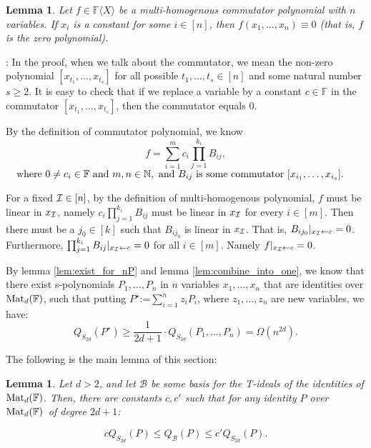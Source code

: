 \documentclass[12pt,reqno]{article}
\newtheorem{lemma}[theorem]{Lemma}
\renewcommand{\dot}[1]{{#1}^\star}
\newcommand\F{\ensuremath{\mathbb F}}
\newcommand\N{\ensuremath{\mathbb N}}
\newcommand{\cd}{\cdot}
\newcommand{\matd}{{\ensuremath{{\rm Mat}_d(\F)}}}
\newcommand{\freea}{\ensuremath{\F\langle X\rangle}}
\newenvironment{proof}{\QuadSpace\par\noindent{\bf Proof}:}{\EndProof\HalfSpace}
\newcommand{\QuadSpace}{\vspace{0.25\baselineskip}}
\newcommand{\HalfSpace}{\vspace{0.5\baselineskip}}
\newcommand{\EndProof}{ \hfill \vrule width 1ex height 1ex depth 0pt }
\newcommand{\nx}[1]{#1_1,\ldots,#1_{n}}
\newcommand\ii{{\cal I}}
\begin{document}
\begin{lemma}\label{lem:collapse}
  Let  $f\in \freea$ be a  multi-homogenous  commutator polynomial with $n$ variables.
 If $x_i$ is a constant for some  $i\in[n]$,  then $f(\nx{x})\equiv 0$ (that is, $f$ is the zero polynomial).
\end{lemma}
\begin{proof} In the proof, when we talk about the commutator, we mean the non-zero polynomial $[x_{t_1},\ldots,x_{t_s}]$ for all possible $t_1,\ldots, t_s\in[n]$ and some natural number $s\geq 2$. It is easy to check that if we replace a variable by  a constant $c\in \F$ in the commutator $[x_{t_1},\ldots,x_{t_s}]$, then the commutator equals $0$.

By the definition of commutator polynomial, we know
$$f=\sum_{i=1}^m c_i\prod_{j=1}^{k_i} B_{ij},$$
$~~~\text{where }0\neq c_i\in \F\hbox{ and }m,n\in \N,\text{ and  $B_{ij}$ is some  commutator $[x_{i_1},\ldots,x_{i_s}]$}. $
\smallskip


For a fixed $\ii\in[n]$, by the  definition of multi-homogenous polynomial, $f$ must be linear in  $x_\ii$, namely $c_i\prod_{j=1}^{k_i}B_{ij}$ must be linear in  $x_\ii$ for every $i\in[m]$. Then there must be a $j_0\in[k]$ such that $B_{ij_0}$ is linear in $x_\ii$. That is, $B_{ij_0}|_{x_\ii\leftarrow c}=0$. Furthermore,  $\prod_{j=1}^{k_i}B_{ij}|_{x_\ii\leftarrow c}=0$ for all $i\in[m]$. Namely
$f|_{x_\ii\leftarrow c}=0$.
\end{proof}





By lemma \ref{lem:exist_for_nP} and lemma \ref{lem:combine_into_one}, we know that there exist s-polynomials $\nx{P}$ in $n$ variables $\nx{x}$ that are identities over  \matd, such that putting  $\dot{P}$:=$\sum_{i=1}^n z_iP_i$, where  $\nx{z}$ are new variables, we have:
$$Q_{S_{2d}}(\dot{P})\geq\frac{1}{2d+1}\cd Q_{S_{2d}}(\nx{P})=\Omega(n^{2d}).$$
\medskip

The following is the main lemma of this section:
\begin{lemma}\label{lem:relation-S-2d-Matd}
  Let $d>2$, and let $\mathcal B$ be some basis for the T-ideals of the identities of \matd. Then, there are constants $c,c'$ such that for any identity $P$ over \matd\ of   degree $2d+1$:

  $$  c Q_{S_{2d}}(P)\le Q_{\mathcal B}(P)\le c' Q_{S_{2d}}(P).$$

\end{lemma}
\end{document}
